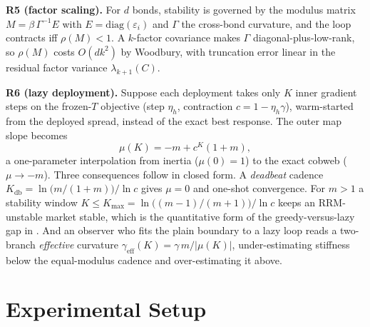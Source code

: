 \documentclass[sigconf]{acmart}
\newcommand{\eps}{\varepsilon}
\newcommand{\geff}{\gamma_{\mathrm{eff}}}
\newcommand{\Kdb}{K_{\mathrm{db}}}
\newcommand{\Kmax}{K_{\max}}
\begin{document}
\textbf{R5 (factor scaling).} For $d$ bonds, stability is governed by the
modulus matrix $M=\beta\,\Gamma^{-1}E$ with $E=\mathrm{diag}(\eps_i)$ and
$\Gamma$ the cross-bond curvature, and the loop contracts iff $\rho(M)<1$. A
$k$-factor covariance makes $\Gamma$ diagonal-plus-low-rank, so $\rho(M)$
costs $O(dk^2)$ by Woodbury, with truncation error linear in the residual
factor variance $\lambda_{k+1}(C)$.

\textbf{R6 (lazy deployment).} Suppose each deployment takes only $K$ inner
gradient steps on the frozen-$T$ objective (step $\eta_h$, contraction
$c=1-\eta_h\gamma$), warm-started from the deployed spread, instead of the
exact best response. The outer map slope becomes
\begin{equation}
\mu(K)=-m+c^K(1+m),
\label{eq:lazy}
\end{equation}
a one-parameter interpolation from inertia ($\mu(0)=1$) to the exact cobweb
($\mu\to-m$). Three consequences follow in closed form. A \emph{deadbeat}
cadence $\Kdb=\ln\!\big(m/(1+m)\big)/\ln c$ gives $\mu=0$ and one-shot
convergence. For $m>1$ a stability window $K\le\Kmax=
\ln\!\big((m-1)/(m+1)\big)/\ln c$ keeps an RRM-unstable market stable, which
is the quantitative form of the greedy-versus-lazy gap in
\cite{perdomo2020performative,mendlerdunner2020stochastic}. And an observer
who fits the plain boundary to a lazy loop reads a two-branch
\emph{effective} curvature $\geff(K)=\gamma\,m/|\mu(K)|$, under-estimating
stiffness below the equal-modulus cadence and over-estimating it above.

\section{Experimental Setup}
\label{sec:system}
\end{document}
